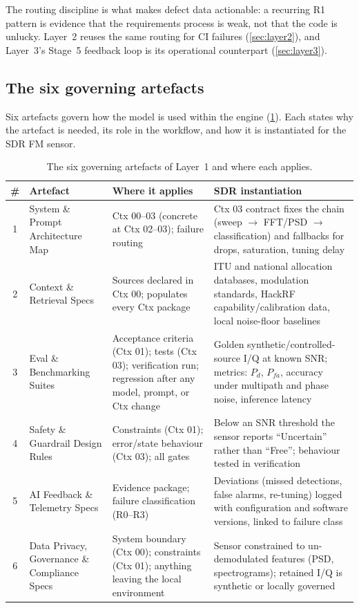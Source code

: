 \documentclass[11pt,a4paper]{article}
\begin{document}
The routing discipline is what makes defect data actionable: a recurring R1 pattern is evidence
that the requirements process is weak, not that the code is unlucky. Layer~2 reuses the same
routing for CI failures (\cref{sec:layer2}), and Layer~3's Stage~5 feedback loop is its
operational counterpart (\cref{sec:layer3}).

\subsection{The six governing artefacts}
\label{sec:artefacts}

Six artefacts govern how the model is used within the engine
(\cref{tab:artefacts}). Each states why the artefact is needed, its role in the workflow, and how
it is instantiated for the SDR FM sensor.

\begin{table}[htbp]
\centering
\caption{The six governing artefacts of Layer~1 and where each applies.}
\label{tab:artefacts}
\small
\setlength{\tabcolsep}{5pt}
\begin{tabular}{@{}clp{4.4cm}p{6.2cm}@{}}
\toprule
\textbf{\#} & \textbf{Artefact} & \textbf{Where it applies} & \textbf{SDR instantiation} \\
\midrule
1 & System \& Prompt Architecture Map & Ctx 00--03 (concrete at Ctx 02--03); failure routing & Ctx 03 contract fixes the chain (sweep $\rightarrow$ FFT/PSD $\rightarrow$ classification) and fallbacks for drops, saturation, tuning delay \\
2 & Context \& Retrieval Specs & Sources declared in Ctx 00; populates every Ctx package & ITU and national allocation databases, modulation standards, HackRF capability/calibration data, local noise-floor baselines \\
3 & Eval \& Benchmarking Suites & Acceptance criteria (Ctx 01); tests (Ctx 03); verification run; regression after any model, prompt, or Ctx change & Golden synthetic/controlled-source I/Q at known SNR; metrics: $P_d$, $P_{fa}$, accuracy under multipath and phase noise, inference latency \\
4 & Safety \& Guardrail Design Rules & Constraints (Ctx 01); error/state behaviour (Ctx 03); all gates & Below an SNR threshold the sensor reports ``Uncertain'' rather than ``Free''; behaviour tested in verification \\
5 & AI Feedback \& Telemetry Specs & Evidence package; failure classification (R0--R3) & Deviations (missed detections, false alarms, re-tuning) logged with configuration and software versions, linked to failure class \\
6 & Data Privacy, Governance \& Compliance Specs & System boundary (Ctx 00); constraints (Ctx 01); anything leaving the local environment & Sensor constrained to un-demodulated features (PSD, spectrograms); retained I/Q is synthetic or locally governed \\
\bottomrule
\end{tabular}
\end{table}
\end{document}

